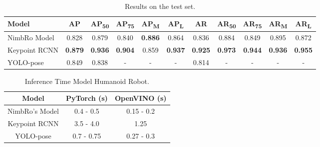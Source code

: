 \begin{longtable}{|L{1.5cm}|c|c|c|c|c|c|c|c|c|c|}
  \caption{Results on the test set.}
  \label{tb:result-on-test-set}\\
  \hline
  \textbf{Model} & \textbf{AP} & \textbf{AP\textsubscript{50}} & \textbf{AP\textsubscript{75}} & \textbf{AP\textsubscript{M}} & \textbf{AP\textsubscript{L}} & \textbf{AR} & \textbf{AR\textsubscript{50}} & \textbf{AR\textsubscript{75}} & \textbf{AR\textsubscript{M}} & \textbf{AR\textsubscript{L}} \\
  \hline
  NimbRo Model & 0.828       & 0.879                         & 0.840                         & \textbf{0.886}                       & 0.864                        & 0.836       & 0.884                         & 0.849                         & 0.895                        & 0.872 \\
  \hline                        
  Keypoint RCNN  & \textbf{0.879}       & \textbf{0.936}                         & \textbf{0.904}                         & 0.859                        & \textbf{0.937}                       & \textbf{0.925}       & \textbf{0.973}                         & \textbf{0.944}                         & \textbf{0.936}                        & \textbf{0.955} \\
  \hline                        
  YOLO-pose      & 0.849       & 0.838                         & -                             & -                            & -                            & 0.814       & -                             & -                             & -                            & - \\
  \hline
\end{longtable}

\def\arraystretch{1.5}
\begin{longtable}{|c|c|c|}
  \caption{Inference Time Model Humanoid Robot.}
  \label{tb:inferencerobot}\\
  \hline
  \rowcolor[HTML]{C0C0C0}
  \textbf{Model}    & \textbf{PyTorch (s)} & \textbf{OpenVINO (s)}\\
  \hline
  NimbRo's Model & 0.4 - 0.5 & 0.15 - 0.2 \\
  \hline
  Keypoint RCNN  & 3.5 - 4.0 & 1.25 \\
  \hline
  YOLO-pose      & 0.7 - 0.75& 0.27 - 0.3 \\
  \hline
\end{longtable}

